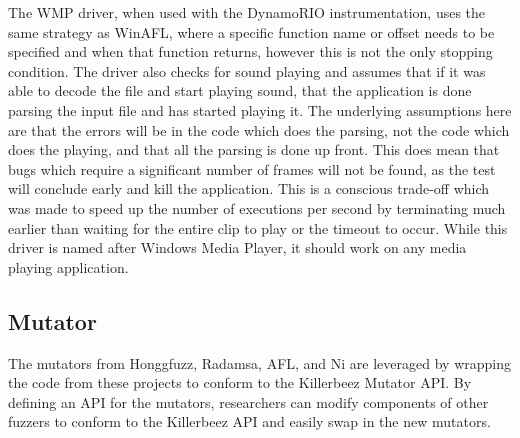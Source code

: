 The WMP driver, when used with the DynamoRIO instrumentation, uses the same strategy as WinAFL, where a specific function
name or offset needs to be specified and when that function returns, however
this is not the only stopping condition. The driver also checks for sound
playing and assumes that if it was able to decode the file and start playing
sound, that the application is done parsing the input file and has started
playing it. The underlying assumptions here are that the errors will be in the
code which does the parsing, not the code which does the playing, and that all
the parsing is done up front.  This does mean that bugs which require a
significant number of frames will not be found, as the test will conclude
early and kill the application.  This is a conscious trade-off which was made
to speed up the number of executions per second by terminating much earlier than
waiting for the entire clip to
play or the timeout to occur.  While this driver is named after Windows Media Player,
it should work on any media playing application. 

\subsection{Mutator} \label{Mutator}
The mutators from Honggfuzz, Radamsa, AFL, and Ni are leveraged by wrapping the
code from these projects to conform to the Killerbeez Mutator API. By
defining an API for the mutators, researchers can modify components of other
fuzzers to conform to the Killerbeez API and easily swap in the new mutators.

